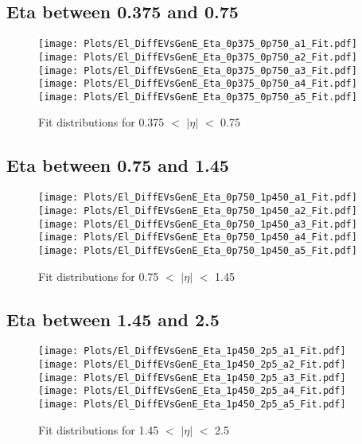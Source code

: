 \documentclass[a4paper,10pt]{article}
\begin{document}
 \subsection{Eta between 0.375 and 0.75}
 \begin{figure}[h!b] 
  \texttt{[image: Plots/El\_DiffEVsGenE\_Eta\_0p375\_0p750\_a1\_Fit.pdf]} 
  \texttt{[image: Plots/El\_DiffEVsGenE\_Eta\_0p375\_0p750\_a2\_Fit.pdf]} \\ 
  \texttt{[image: Plots/El\_DiffEVsGenE\_Eta\_0p375\_0p750\_a3\_Fit.pdf]} 
  \texttt{[image: Plots/El\_DiffEVsGenE\_Eta\_0p375\_0p750\_a4\_Fit.pdf]} \\ 
  \texttt{[image: Plots/El\_DiffEVsGenE\_Eta\_0p375\_0p750\_a5\_Fit.pdf]} 
 \caption{Fit distributions for 0.375 $<$ $\vert \eta \vert$ $<$ 0.75}
 \end{figure}
 \newpage 
 \subsection{Eta between 0.75 and 1.45}
 \begin{figure}[h!b] 
  \texttt{[image: Plots/El\_DiffEVsGenE\_Eta\_0p750\_1p450\_a1\_Fit.pdf]} 
  \texttt{[image: Plots/El\_DiffEVsGenE\_Eta\_0p750\_1p450\_a2\_Fit.pdf]} \\ 
  \texttt{[image: Plots/El\_DiffEVsGenE\_Eta\_0p750\_1p450\_a3\_Fit.pdf]} 
  \texttt{[image: Plots/El\_DiffEVsGenE\_Eta\_0p750\_1p450\_a4\_Fit.pdf]} \\ 
  \texttt{[image: Plots/El\_DiffEVsGenE\_Eta\_0p750\_1p450\_a5\_Fit.pdf]} 
 \caption{Fit distributions for 0.75 $<$ $\vert \eta \vert$ $<$ 1.45}
 \end{figure}
 \newpage 
 \subsection{Eta between 1.45 and 2.5}
 \begin{figure}[h!b] 
  \texttt{[image: Plots/El\_DiffEVsGenE\_Eta\_1p450\_2p5\_a1\_Fit.pdf]} 
  \texttt{[image: Plots/El\_DiffEVsGenE\_Eta\_1p450\_2p5\_a2\_Fit.pdf]} \\ 
  \texttt{[image: Plots/El\_DiffEVsGenE\_Eta\_1p450\_2p5\_a3\_Fit.pdf]} 
  \texttt{[image: Plots/El\_DiffEVsGenE\_Eta\_1p450\_2p5\_a4\_Fit.pdf]} \\ 
  \texttt{[image: Plots/El\_DiffEVsGenE\_Eta\_1p450\_2p5\_a5\_Fit.pdf]} 
 \caption{Fit distributions for 1.45 $<$ $\vert \eta \vert$ $<$ 2.5}
\end{figure} 
\end{document}
